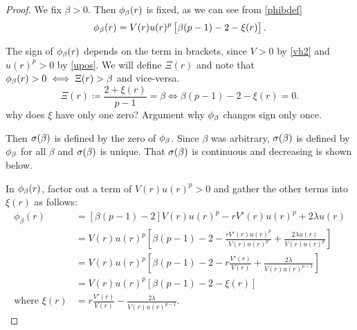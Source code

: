 \begin{proof}
\donegroup
We fix $\beta>0$. Then $\phi_{\beta}(r)$ is fixed, as we can see from \eqref{phibdef}
\[ 
    \phi_{\beta}(r) = V(r) u(r)^p \left[ \beta (p-1) - 2 - \xi(r) \right]. 
\]

The sign of $\phi_{\beta}(r)$ depends on the term in brackets, since $V > 0$ by
\eqref{vh2} and $u(r)^p > 0$ by \eqref{upos}. We will define $\Xi(r)$ and note
that $\phi_{\beta}(r) > 0 \iff \Xi(r) > \beta$ and vice-versa.
% 
% 
\[ 
    \Xi(r) \coloneqq \frac{2 + \xi(r)}{p - 1} = \beta
    \iff \beta (p-1) - 2 - \xi(r) = 0.
\]
\endgroup
{\red why does $\xi$ have only one zero?
Argument why $\phi_{\beta}$ changes sign only once.}

{\red Then $\sigma(\beta)$ is defined by the zero of $\phi_{\beta}$. Since $\beta$ was arbitrary,
$\sigma(\beta)$ is defined by $\phi_{\beta}$ for all $\beta$ and $\sigma(\beta)$ is unique.  That $\sigma(\beta)$
is continuous and decreasing is shown below.}


\revgroup 
In $\phi_{\beta}(r)$, factor out a term of $V(r)u(r)^p>0$ and gather the other terms
into $\xi(r)$ as follows:
\begin{align*}
\phi_{\beta}(r)&=\left[\beta(p-1)-2\right]V(r)u(r)^p-rV'(r)u(r)^p+
2\lambda u(r) \\
&=V(r)u(r)^p\left[\beta(p-1)-2-\frac{rV'(r)u(r)^p}{V(r)u(r)^p}+
\frac{2\lambda u(r)}{V(r)u(r)^p}\right]\\
&=V(r)u(r)^p\left[\beta(p-1)-2-r\frac{V'(r)}{V(r)}+
\frac{2\lambda}{V(r)u(r)^{p-1}}\right]\\
&= V(r)u(r)^p\left[\beta(p-1)-2-\xi(r)\right]\\ 
\text{where }\xi(r)&=r\frac{V'(r)}{V(r)}-\frac{2\lambda}{V(r)u(r)^{p-1}}.  
\end{align*}
\endgroup


\end{proof}
